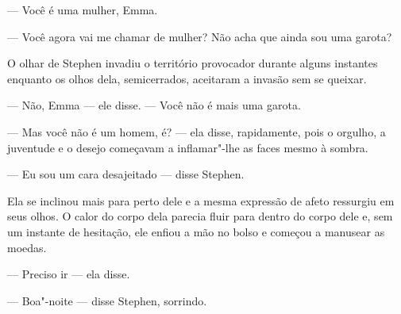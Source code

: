 --- Você é uma mulher, Emma.

--- Você agora vai me chamar de mulher?  Não acha que ainda sou uma garota?

O olhar de Stephen invadiu o território provocador durante alguns instantes
enquanto os olhos dela, semicerrados, aceitaram a invasão sem se queixar.

--- Não, Emma --- ele disse.  --- Você não é mais uma garota.

--- Mas você não é um homem, é? --- ela disse, rapidamente, pois o orgulho, a
juventude e o desejo começavam a inflamar"-lhe as faces mesmo à sombra.

--- Eu sou um cara desajeitado --- disse Stephen.

Ela se inclinou mais para perto dele e a mesma expressão de afeto ressurgiu em
seus olhos.  O calor do corpo dela parecia fluir para dentro do corpo dele e,
sem um instante de hesitação, ele enfiou a mão no bolso e começou a manusear as
moedas.

--- Preciso ir --- ela disse.

--- Boa"-noite --- disse Stephen, sorrindo.

